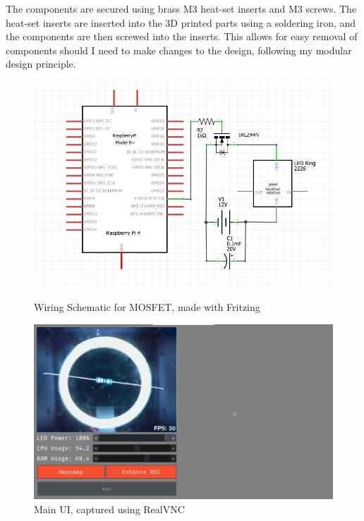 The components are secured using brass M3 heat-set inserts and M3 screws. The heat-set inserts are inserted into the 3D printed parts using a soldering iron,
and the components are then screwed into the inserts. This allows for easy removal of components should I need to make changes to the design, following
my modular design principle.
\begin{figure}
    \begin{minipage}[t]{0.49\textwidth}
      \centering
      \includegraphics[width=\textwidth]{imgs/wiring.jpg}
      \caption{Wiring Schematic for MOSFET, made with Fritzing\cite{fritzing}}
      \label{fig:wiringschematic}
    \end{minipage}
    \hfill
    \begin{minipage}[t]{0.49\textwidth}
        \centering
        \includegraphics[width=\textwidth]{imgs/software/realvnc.jpg}
        \caption{Main UI, captured using RealVNC\cite{realvnc}}
        \label{fig:mainui}
    \end{minipage}
  \end{figure}
  